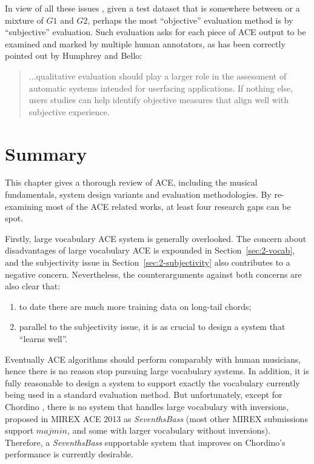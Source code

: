In view of all these issues \cite{humphreyfour,ni2013understanding}, given a test dataset that is somewhere between or a mixture of $G1$ and $G2$, perhaps the most ``objective'' evaluation method is by ``subjective'' evaluation. Such evaluation asks for each piece of ACE output to be examined and marked by multiple human annotators, as has been correctly pointed out by Humphrey and Bello:
\begin{quote}
...qualitative evaluation should play a larger role in the assessment of automatic systems intended for userfacing applications. If nothing else, users studies can help identify objective measures that align well with subjective experience.
\end{quote}

\section{Summary} \label{sec:2-summary}
This chapter gives a thorough review of ACE, including the musical fundamentals, system design variants and evaluation methodologies. By re-examining most of the ACE related works, at least four research gaps can be spot.

Firstly, large vocabulary ACE system is generally overlooked. The concern about disadvantages of large vocabulary ACE is expounded in Section~\ref{sec:2-vocab}, and the subjectivity issue in Section~\ref{sec:2-subjectivity} also contributes to a negative concern. Nevertheless, the counterarguments against both concerns are also clear that:
\begin{enumerate}
\item to date there are much more training data on long-tail chords;
\item parallel to the subjectivity issue, it is as crucial to design a system that ``learns well''.
\end{enumerate}
Eventually ACE algorithms should perform comparably with human musicians, hence there is no reason stop pursuing large vocabulary systems. In addition, it is fully reasonable to design a system to support exactly the vocabulary currently being used in a standard evaluation method. But unfortunately, except for Chordino \cite{cannam2010sonic}, there is no system that handles large vocabulary with inversions, proposed in MIREX ACE 2013 as \textit{SeventhsBass} (most other MIREX submissions support $majmin$, and some with larger vocabulary without inversions). Therefore, a \textit{SeventhsBass} supportable system that improves on Chordino's performance is currently desirable.

